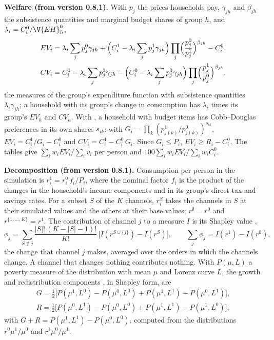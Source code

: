 \textbf{Welfare (from version 0.8.1).} With $p_j$ the prices households
pay, $\gamma_{jh}$ and $\beta_{jh}$ the subsistence quantities and marginal
budget shares of group $h$, and $\lambda_i = C^0_i/\V{EH}^0_h$,
\begin{gather*}
EV_i = \lambda_i \sum_j p^0_j\gamma_{jh} + \Bigl(C^1_i - \lambda_i \sum_j p^1_j\gamma_{jh}\Bigr)\prod_j \Bigl(\frac{p^0_j}{p^1_j}\Bigr)^{\beta_{jh}} - C^0_i,\\
CV_i = C^1_i - \lambda_i \sum_j p^1_j\gamma_{jh} - \Bigl(C^0_i - \lambda_i \sum_j p^0_j\gamma_{jh}\Bigr)\prod_j \Bigl(\frac{p^1_j}{p^0_j}\Bigr)^{\beta_{jh}},
\end{gather*}
the measures of the group's expenditure function with subsistence quantities
$\lambda_i \gamma_{jh}$; a household with its group's change in consumption
has $\lambda_i$ times its group's $EV_h$ and $CV_h$. With , a
household with budget items has Cobb--Douglas preferences in its own shares
$s_{ik}$: with $G_i = \prod_k (p^1_{j(k)}/p^0_{j(k)})^{s_{ik}}$,
$EV_i = C^1_i/G_i - C^0_i$ and $CV_i = C^1_i - C^0_i\,G_i$. Since $G_i \le P_i$,
$EV_i \ge R_i - C^0_i$. The tables give $\sum_i w_i EV_i / \sum_i v_i$ per
person and $100 \sum_i w_i EV_i / \sum_i w_i C^0_i$.

\textbf{Decomposition (from version 0.8.1).} Consumption per person in the
simulation is $r^1_i = r^0_i\,f_i/P_i$, where the nominal factor $f_i$ is the
product of the changes in the household's income components and in its
group's direct tax and savings rates. For a subset $S$ of the $K$ channels,
$r^S_i$ takes the channels in $S$ at their simulated values and the others at
their base values; $r^\emptyset = r^0$ and $r^{\{1, \dots, K\}} = r^1$. The
contribution of channel $j$ to a measure $I$ is its Shapley value
\citep{shorrocks2013},
\begin{equation*}
\phi_j = \sum_{S \not\ni j} \frac{|S|!\,(K - |S| - 1)!}{K!}\,\bigl[I(r^{S \cup \{j\}}) - I(r^S)\bigr],
\qquad \sum_j \phi_j = I(r^1) - I(r^0),
\end{equation*}
the change that channel $j$ makes, averaged over the orders in which the
channels change. A channel that changes nothing contributes nothing. With
$P(\mu, L)$ a poverty measure of the distribution with mean $\mu$ and Lorenz
curve $L$, the growth and redistribution components \citep{datt1992}, in
Shapley form, are
\begin{gather*}
G = \tfrac12\bigl[P(\mu^1, L^0) - P(\mu^0, L^0) + P(\mu^1, L^1) - P(\mu^0, L^1)\bigr],\\
R = \tfrac12\bigl[P(\mu^0, L^1) - P(\mu^0, L^0) + P(\mu^1, L^1) - P(\mu^1, L^0)\bigr],
\end{gather*}
with $G + R = P(\mu^1, L^1) - P(\mu^0, L^0)$, computed from the distributions
$r^0 \mu^1/\mu^0$ and $r^1 \mu^0/\mu^1$.

